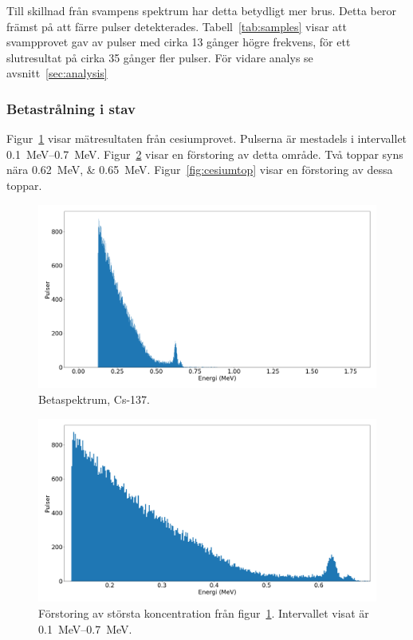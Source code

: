 Till skillnad från svampens spektrum har detta betydligt mer brus. Detta beror
främst på att färre pulser detekterades. Tabell~\ref{tab:samples} visar att
svampprovet gav av pulser med cirka \num{13} gånger högre frekvens, för ett
slutresultat på cirka \num{35} gånger fler pulser. För vidare analys se
avsnitt~\ref{sec:analysis}

\subsubsection{Betastrålning i stav}

Figur~\ref{fig:cesium} visar mätresultaten från cesiumprovet. Pulserna är
mestadels i intervallet \qtyrange{0.1}{0.7}{\MeV}. Figur~\ref{fig:cesiumzoom}
visar en förstoring av detta område. Två toppar syns nära
\qtylist{0.62;0.65}{\MeV}. Figur~\ref{fig:cesiumtop} visar en förstoring av
dessa toppar.

\begin{figure}[!ht]
    \centering
    \includegraphics[width=\textwidth, keepaspectratio]{../images/cesium.png}
    \caption{Betaspektrum, Cs-137.}
    \label{fig:cesium}
\end{figure}

\begin{figure}[!ht]
    \centering
    \includegraphics[width=\textwidth, keepaspectratio]{../images/cesium_zoom.png}
    \caption{
        Förstoring av största koncentration från figur~\ref{fig:cesium}.
        Intervallet visat är \qtyrange{0.1}{0.7}{\MeV}.
    }
    \label{fig:cesiumzoom}
\end{figure}

